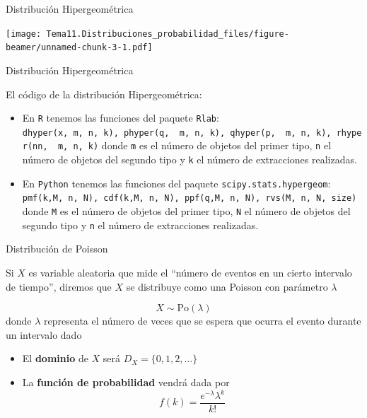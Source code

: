 \documentclass[
  ignorenonframetext,
]{beamer}
\providecommand{\tightlist}{%
  \setlength{\itemsep}{0pt}\setlength{\parskip}{0pt}}
\begin{document}
\begin{frame}{Distribución Hipergeométrica}
\protect\hypertarget{distribuciuxf3n-hipergeomuxe9trica-2}{}

\texttt{[image: Tema11.Distribuciones\_probabilidad\_files/figure-beamer/unnamed-chunk-3-1.pdf]}

\end{frame}

\begin{frame}[fragile]{Distribución Hipergeométrica}
\protect\hypertarget{distribuciuxf3n-hipergeomuxe9trica-3}{}

El código de la distribución Hipergeométrica:

\begin{itemize}
\tightlist
\item
  En \texttt{R} tenemos las funciones del paquete \texttt{Rlab}:
  \texttt{dhyper(x,\ m,\ n,\ k),\ phyper(q,\ \ m,\ n,\ k),\ qhyper(p,\ \ m,\ n,\ k),\ rhyper(nn,\ \ m,\ n,\ k)}
  donde \texttt{m} es el número de objetos del primer tipo, \texttt{n}
  el número de objetos del segundo tipo y \texttt{k} el número de
  extracciones realizadas.
\item
  En \texttt{Python} tenemos las funciones del paquete
  \texttt{scipy.stats.hypergeom}:
  \texttt{pmf(k,M,\ n,\ N),\ cdf(k,M,\ n,\ N),\ ppf(q,M,\ n,\ N),\ rvs(M,\ n,\ N,\ size)}
  donde \texttt{M} es el número de objetos del primer tipo, \texttt{N}
  el número de objetos del segundo tipo y \texttt{n} el número de
  extracciones realizadas.
\end{itemize}

\end{frame}

\begin{frame}{Distribución de Poisson}
\protect\hypertarget{distribuciuxf3n-de-poisson}{}

Si \(X\) es variable aleatoria que mide el ``número de eventos en un
cierto intervalo de tiempo'', diremos que \(X\) se distribuye como una
Poisson con parámetro \(\lambda\)

\[X\sim \text{Po}(\lambda)\] donde \(\lambda\) representa el número de
veces que se espera que ocurra el evento durante un intervalo dado

\begin{itemize}
\item
  El \textbf{dominio} de \(X\) será \(D_X = \{0,1,2,\dots\}\)
\item
  La \textbf{función de probabilidad} vendrá dada por
  \[f(k) = \frac{e^{-\lambda}\lambda^k}{k!}\]
\end{itemize}

\end{frame}
\end{document}
